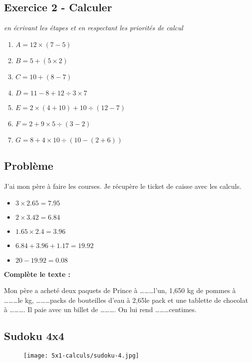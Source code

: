 \subsection*{Exercice 2 - Calculer}
\textit{en écrivant les étapes et en respectant les priorités de calcul}

\begin{enumerate}
  \item $A = 12 \times (7-5)$ \\
  \item $B = 5 + (5 \times 2)$ \\
  \item $C = 10 + (8 - 7)$ \\
  \item $D = 11 - 8 + 12 \div 3 \times 7$ \\
  \item $E = 2 \times (4+10) + 10 \div (12-7)$ \\
  \item $F = 2 + 9 \times 5 \div (3-2)$ \\
  \item $G = 8 + 4 \times 10\div (10-(2+6))$ \\
\end{enumerate}

\subsection*{Problème}

J'ai mon père à faire les courses. Je récupère le ticket de caisse avec les calculs.
\begin{itemize}
  \item $3 \times 2.65 = 7.95$
  \item $2 \times 3.42 = 6.84$
  \item $1.65 \times 2.4 = 3.96$
  \item $6.84 + 3.96 + 1.17 = 19.92$
  \item $20 - 19.92 = 0.08$
\end{itemize}

\textbf{Complète le texte : }

Mon père a acheté deux paquets de Prince à \ldots\ldots\ldots l'un, 1,650 kg de pommes à \ldots\ldots\ldots le kg, \ldots\ldots\ldots packs de bouteilles d'eau à 2,65\euros le pack et une tablette de chocolat à \ldots\ldots\ldots . Il paie avec un billet de \ldots\ldots\ldots . On lui rend \ldots\ldots\ldots centimes.

\subsection*{Sudoku 4x4}

\begin{figure}[H]
  \centering
  \texttt{[image: 5x1-calculs/sudoku-4.jpg]}
\end{figure}

\newpage


